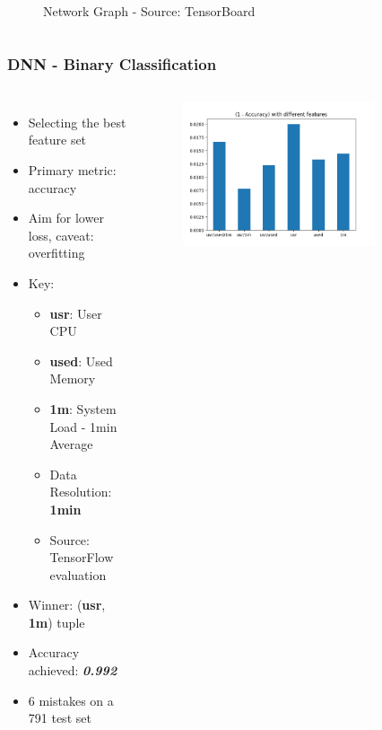 \documentclass[aspectratio=169,11pt,hyperref={colorlinks=true}]{beamer}
\begin{document}
\begin{frame}
\begin{columns}
\begin{figure}
\begin{center}
             \caption{Network Graph - Source: TensorBoard}
        \end{center}
        \end{figure}
    \end{columns}
\end{frame}

\begin{frame}
    \frametitle{DNN - Binary Classification}
    \begin{columns}
        \begin{itemize}
            \item{Selecting the best feature set}
            \item{Primary metric: accuracy}
            \item{Aim for lower loss, caveat: overfitting}
            \item{Key:}
            \begin{itemize}
              \item{\textbf{usr}: User CPU}
              \item{\textbf{used}: Used Memory}
              \item{\textbf{1m}: System Load - 1min Average}
              \item{Data Resolution: \textbf{1min}}
              \item{Source: TensorFlow evaluation}
            \end{itemize}
            \item{Winner: (\textbf{usr}, \textbf{1m}) tuple}
            \item{Accuracy achieved: \emph{\textbf{0.992}}}
            \item{6 mistakes on a 791 test set}
        \end{itemize}
        \begin{center}
        \begin{figure}
          \includegraphics[width=0.8\textwidth,height=0.4\textheight]{graphs/accuracy_by_feature-status.png}

\end{figure}
\end{center}
\end{columns}
\end{frame}
\end{document}
